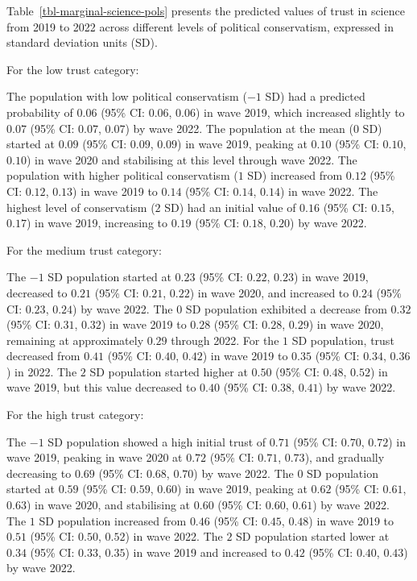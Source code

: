 \documentclass[
  single column]{article}
\begin{document}
Table~\ref{tbl-marginal-science-pols} presents the predicted values of
trust in science from 2019 to 2022 across different levels of political
conservatism, expressed in standard deviation units (SD).

For the low trust category:

The population with low political conservatism (\(-1\) SD) had a
predicted probability of \(0.06\) (95\% CI: \(0.06\), \(0.06\)) in wave
2019, which increased slightly to \(0.07\) (95\% CI: \(0.07\), \(0.07\))
by wave 2022. The population at the mean (\(0\) SD) started at \(0.09\)
(95\% CI: \(0.09\), \(0.09\)) in wave 2019, peaking at \(0.10\) (95\%
CI: \(0.10\), \(0.10\)) in wave 2020 and stabilising at this level
through wave 2022. The population with higher political conservatism
(\(1\) SD) increased from \(0.12\) (95\% CI: \(0.12\), \(0.13\)) in wave
2019 to \(0.14\) (95\% CI: \(0.14\), \(0.14\)) in wave 2022. The highest
level of conservatism (\(2\) SD) had an initial value of \(0.16\) (95\%
CI: \(0.15\), \(0.17\)) in wave 2019, increasing to \(0.19\) (95\% CI:
\(0.18\), \(0.20\)) by wave 2022.

For the medium trust category:

The \(-1\) SD population started at \(0.23\) (95\% CI: \(0.22\),
\(0.23\)) in wave 2019, decreased to \(0.21\) (95\% CI: \(0.21\),
\(0.22\)) in wave 2020, and increased to \(0.24\) (95\% CI: \(0.23\),
\(0.24\)) by wave 2022. The \(0\) SD population exhibited a decrease
from \(0.32\) (95\% CI: \(0.31\), \(0.32\)) in wave 2019 to \(0.28\)
(95\% CI: \(0.28\), \(0.29\)) in wave 2020, remaining at approximately
\(0.29\) through 2022. For the \(1\) SD population, trust decreased from
\(0.41\) (95\% CI: \(0.40\), \(0.42\)) in wave 2019 to \(0.35\) (95\%
CI: \(0.34\), \(0.36\)) in 2022. The \(2\) SD population started higher
at \(0.50\) (95\% CI: \(0.48\), \(0.52\)) in wave 2019, but this value
decreased to \(0.40\) (95\% CI: \(0.38\), \(0.41\)) by wave 2022.

For the high trust category:

The \(-1\) SD population showed a high initial trust of \(0.71\) (95\%
CI: \(0.70\), \(0.72\)) in wave 2019, peaking in wave 2020 at \(0.72\)
(95\% CI: \(0.71\), \(0.73\)), and gradually decreasing to \(0.69\)
(95\% CI: \(0.68\), \(0.70\)) by wave 2022. The \(0\) SD population
started at \(0.59\) (95\% CI: \(0.59\), \(0.60\)) in wave 2019, peaking
at \(0.62\) (95\% CI: \(0.61\), \(0.63\)) in wave 2020, and stabilising
at \(0.60\) (95\% CI: \(0.60\), \(0.61\)) by wave 2022. The \(1\) SD
population increased from \(0.46\) (95\% CI: \(0.45\), \(0.48\)) in wave
2019 to \(0.51\) (95\% CI: \(0.50\), \(0.52\)) in wave 2022. The \(2\)
SD population started lower at \(0.34\) (95\% CI: \(0.33\), \(0.35\)) in
wave 2019 and increased to \(0.42\) (95\% CI: \(0.40\), \(0.43\)) by
wave 2022.
\end{document}
